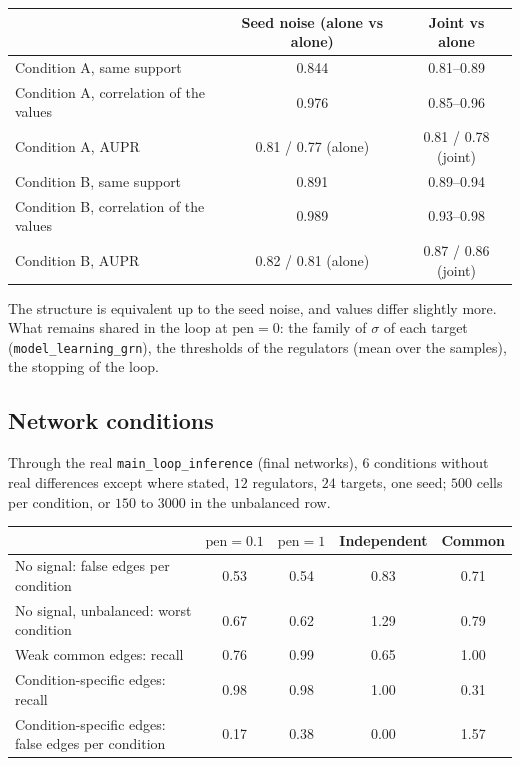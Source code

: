\documentclass[a4paper, 11pt]{article}
\newcommand{\pen}{\mathrm{pen}}
\theoremstyle{plain}
\theoremstyle{remark}
\begin{document}
\begin{center}\small
\begin{tabular}{lcc}
\toprule
 & Seed noise (alone vs alone) & Joint vs alone \\
\midrule
Condition A, same support & 0.844 & 0.81--0.89 \\
Condition A, correlation of the values & 0.976 & 0.85--0.96 \\
Condition A, AUPR & 0.81 / 0.77 (alone) & 0.81 / 0.78 (joint) \\
Condition B, same support & 0.891 & 0.89--0.94 \\
Condition B, correlation of the values & 0.989 & 0.93--0.98 \\
Condition B, AUPR & 0.82 / 0.81 (alone) & 0.87 / 0.86 (joint) \\
\bottomrule
\end{tabular}
\end{center}

The structure is equivalent up to the seed noise, and values differ slightly more. What remains shared in the loop at $\pen = 0$: the family of $\sigma$ of each target (\texttt{model\_learning\_grn}), the thresholds of the regulators (mean over the samples), the stopping of the loop.

\subsection{Network conditions}

Through the real \texttt{main\_loop\_inference} (final networks), $6$ conditions without real differences except where stated, $12$ regulators, $24$ targets, one seed; $500$ cells per condition, or $150$ to $3000$ in the unbalanced row.

\begin{center}\small
\begin{tabular}{lcccc}
\toprule
 & $\pen = 0.1$ & $\pen = 1$ & Independent & Common \\
\midrule
No signal: false edges per condition & 0.53 & 0.54 & 0.83 & 0.71 \\
No signal, unbalanced: worst condition & 0.67 & 0.62 & 1.29 & 0.79 \\
Weak common edges: recall & 0.76 & 0.99 & 0.65 & 1.00 \\
Condition-specific edges: recall & 0.98 & 0.98 & 1.00 & 0.31 \\
Condition-specific edges: false edges per condition & 0.17 & 0.38 & 0.00 & 1.57 \\
\bottomrule
\end{tabular}
\end{center}
\end{document}
